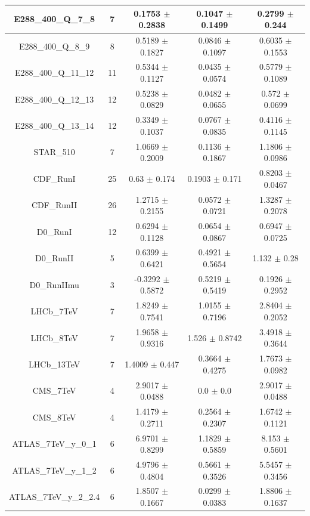 \documentclass[
]{article}
\begin{document}
\begin{table}[h]
\begin{tabular}{|c|c|c|c|c|}
E288\_400\_Q\_7\_8 & 7 & 0.1753 \(\pm\) 0.2838 & 0.1047 \(\pm\)
0.1499 & 0.2799 \(\pm\) 0.244 \\ \hline
E288\_400\_Q\_8\_9 & 8 & 0.5189 \(\pm\) 0.1827 & 0.0846 \(\pm\)
0.1097 & 0.6035 \(\pm\) 0.1553 \\ \hline
E288\_400\_Q\_11\_12 & 11 & 0.5344 \(\pm\) 0.1127 & 0.0435 \(\pm\)
0.0574 & 0.5779 \(\pm\) 0.1089 \\ \hline
E288\_400\_Q\_12\_13 & 12 & 0.5238 \(\pm\) 0.0829 & 0.0482 \(\pm\)
0.0655 & 0.572 \(\pm\) 0.0699 \\ \hline
E288\_400\_Q\_13\_14 & 12 & 0.3349 \(\pm\) 0.1037 & 0.0767 \(\pm\)
0.0835 & 0.4116 \(\pm\) 0.1145 \\ \hline
STAR\_510 & 7 & 1.0669 \(\pm\) 0.2009 & 0.1136 \(\pm\) 0.1867 & 1.1806
\(\pm\) 0.0986 \\ \hline
CDF\_RunI & 25 & 0.63 \(\pm\) 0.174 & 0.1903 \(\pm\) 0.171 & 0.8203
\(\pm\) 0.0467 \\ \hline
CDF\_RunII & 26 & 1.2715 \(\pm\) 0.2155 & 0.0572 \(\pm\) 0.0721 & 1.3287
\(\pm\) 0.2078 \\ \hline
D0\_RunI & 12 & 0.6294 \(\pm\) 0.1128 & 0.0654 \(\pm\) 0.0867 & 0.6947
\(\pm\) 0.0725 \\ \hline
D0\_RunII & 5 & 0.6399 \(\pm\) 0.6421 & 0.4921 \(\pm\) 0.5654 & 1.132
\(\pm\) 0.28 \\ \hline
D0\_RunIImu & 3 & -0.3292 \(\pm\) 0.5872 & 0.5219 \(\pm\)
0.5419 & 0.1926 \(\pm\) 0.2952 \\ \hline
LHCb\_7TeV & 7 & 1.8249 \(\pm\) 0.7541 & 1.0155 \(\pm\) 0.7196 & 2.8404
\(\pm\) 0.2052 \\ \hline
LHCb\_8TeV & 7 & 1.9658 \(\pm\) 0.9316 & 1.526 \(\pm\) 0.8742 & 3.4918
\(\pm\) 0.3644 \\ \hline
LHCb\_13TeV & 7 & 1.4009 \(\pm\) 0.447 & 0.3664 \(\pm\) 0.4275 & 1.7673
\(\pm\) 0.0982 \\ \hline
CMS\_7TeV & 4 & 2.9017 \(\pm\) 0.0488 & 0.0 \(\pm\) 0.0 & 2.9017 \(\pm\)
0.0488 \\ \hline
CMS\_8TeV & 4 & 1.4179 \(\pm\) 0.2711 & 0.2564 \(\pm\) 0.2307 & 1.6742
\(\pm\) 0.1121 \\ \hline
ATLAS\_7TeV\_y\_0\_1 & 6 & 6.9701 \(\pm\) 0.8299 & 1.1829 \(\pm\)
0.5859 & 8.153 \(\pm\) 0.5601 \\ \hline
ATLAS\_7TeV\_y\_1\_2 & 6 & 4.9796 \(\pm\) 0.4804 & 0.5661 \(\pm\)
0.3526 & 5.5457 \(\pm\) 0.3456 \\ \hline
ATLAS\_7TeV\_y\_2\_2.4 & 6 & 1.8507 \(\pm\) 0.1667 & 0.0299 \(\pm\)
0.0383 & 1.8806 \(\pm\) 0.1637 \\ \hline

\end{tabular}
\end{table}
\end{document}

